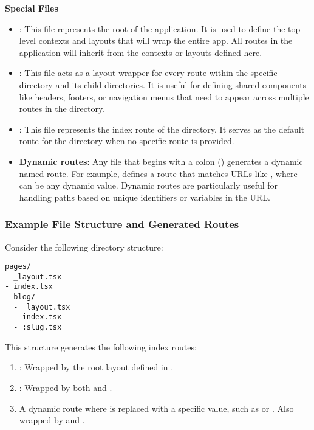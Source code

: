 \textbf{Special Files}
\begin{itemize}
	\item {}: This file represents the root of the application. It is used to define the top-level contexts and layouts that will wrap the entire app. All routes in the application will inherit from the contexts or layouts defined here.
	\item {}: This file acts as a layout wrapper for every route within the specific directory and its child directories. It is useful for defining shared components like headers, footers, or navigation menus that need to appear across multiple routes in the directory.
	\item {}: This file represents the index route of the directory. It serves as the default route for the directory when no specific route is provided.
	\item \textbf{Dynamic routes}: Any file that begins with a colon (\cc{:}) generates a dynamic named route. For example,  defines a route that matches URLs like , where  can be any dynamic value. Dynamic routes are particularly useful for handling paths based on unique identifiers or variables in the URL.
\end{itemize}

\subsubsection{Example File Structure and Generated Routes}
Consider the following directory structure:

\begin{verbatim}
pages/
- _layout.tsx
- index.tsx
- blog/
  - _layout.tsx
  - index.tsx
  - :slug.tsx
\end{verbatim}

This structure generates the following index routes:
\begin{enumerate}
	\item \cc{/}: Wrapped by the root layout defined in .
	\item {}: Wrapped by both  and .
	\item {} A dynamic route where  is replaced with a specific value, such as  or . Also wrapped by  and .
\end{enumerate}

